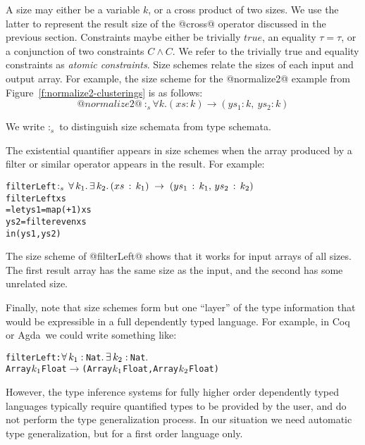 A size may either be a variable $k$, or a cross product of two sizes. We use the latter to represent the result size of the @cross@ operator discussed in the previous section. Constraints maybe either be trivially $true$, an equality $\tau = \tau$, or a conjunction of two constraints $C \wedge C$. We refer to the trivially true and equality constraints as \emph{atomic constraints}. Size schemes relate the sizes of each input and output array. For example, the size scheme for the @normalize2@ example from Figure~\ref{f:normalize2-clusterings} is as follows:
$$@normalize2@ ~:_s \forall k. (xs : k) \to (ys_1 : k,~ ys_2 : k)
$$

We write $:_s$ to distinguish size schemata from type schemata.

The existential quantifier appears in size schemes when the array produced by a filter or similar operator appears in the result. For example:
\begin{alltt}
   filterLeft \(:\sb{s}\,\forall\,k\sb{1}.\,\exists\,k\sb{2}.\,(xs\,:\,k\sb{1})\;\to\;(ys\sb{1}\,:\,k\sb{1},\,ys\sb{2}\,:\,k\sb{2})\)
   filterLeft xs
     = let ys1 = map (+ 1)   xs
           ys2 = filter even xs
       in (ys1, ys2)
\end{alltt}

The size scheme of @filterLeft@ shows that it works for input arrays of all sizes. The first result array has the same size as the input, and the second has some unrelated size.

Finally, note that size schemes form but one ``layer'' of the type information that would be expressible in a full dependently typed language. For example, in Coq or Agda~\CITE we could write something like:
\begin{alltt}
filterLeft : \(\forall\,k\sb{1}:\,\)Nat\(.\,\exists\,k\sb{2}:\,\)Nat\(.\) 
  Array \(k\sb{1}\) Float \(\to\) (Array \(k\sb{1}\) Float, Array \(k\sb{2}\) Float)
\end{alltt}

However, the type inference systems for fully higher order dependently typed languages typically require quantified types to be provided by the user, and do not perform the type generalization process. In our situation we need automatic type generalization, but for a first order language only.


